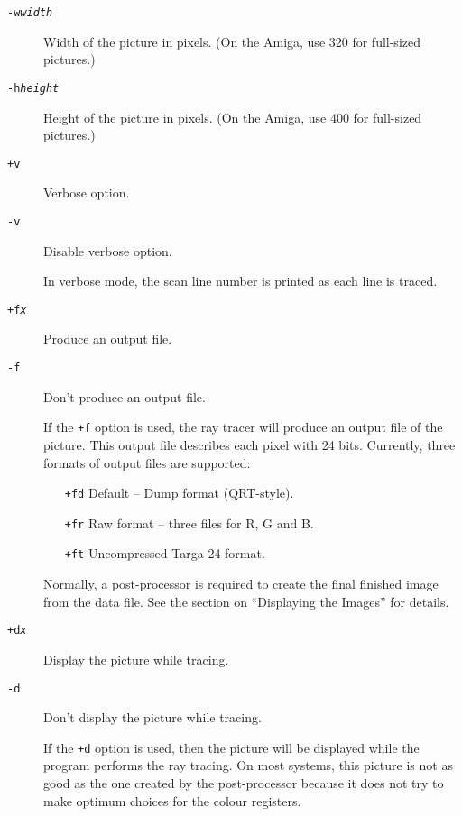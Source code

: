 \begin{description}
\item[{\tt -w{\em width}}] Width
of the picture in pixels. (On the Amiga, use 320 for full-sized pictures.)

\item[{\tt -h{\em height}}] Height
of the picture in pixels. (On the Amiga, use 400 for full-sized pictures.)

\item[{\tt +v}] Verbose option.
\noitemsep
\item[{\tt -v}] Disable verbose option.
\doitemsep

In verbose mode, the scan line number is printed as each line is traced.

\item[{\tt +f{\em x}}] Produce
an output file.
\noitemsep
\item[{\tt -f}] Don't produce an output file.
\doitemsep

If the {\tt +f} option is used, the ray tracer will produce an output file
of the picture.  This output file describes each pixel with 24 bits.
Currently, three formats of output files are supported:
\begin{itemize}
\item[{\tt +fd}] Default -- Dump format (QRT-style).
\noitemsep
\item[{\tt +fr}] Raw format -- three files for R, G and B.
\item[{\tt +ft}] Uncompressed Targa-24 format.
\doitemsep
\end{itemize}
Normally, a post-processor is required to create the final finished
image from the data file.  See the section on ``Displaying the Images''
for details.

\item[{\tt +d{\em x}}] Display
the picture while tracing.
\noitemsep
\item[{\tt -d}] Don't display the picture while tracing.
\doitemsep

If the {\tt +d} option is used, then the picture will be displayed while the
program performs the ray tracing.  On most systems, this picture is
not as good as the one created by the post-processor because it does
not try to make optimum choices for the colour registers.


\end{description}
